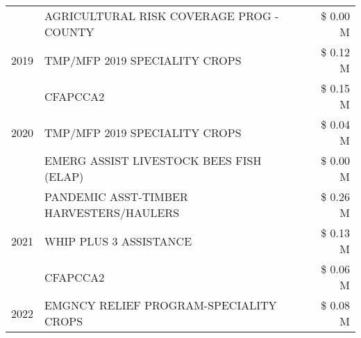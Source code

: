 \begin{tabular}{llr}
 & AGRICULTURAL RISK COVERAGE PROG - COUNTY & \$ 0.00 M \\
\cline{1-3}
2019 & TMP/MFP 2019 SPECIALITY CROPS & \$ 0.12 M \\
\cline{1-3}
\multirow[t]{3}{*}{2020} & CFAPCCA2 & \$ 0.15 M \\
 & TMP/MFP 2019 SPECIALITY CROPS & \$ 0.04 M \\
 & EMERG ASSIST LIVESTOCK BEES FISH (ELAP) & \$ 0.00 M \\
\cline{1-3}
\multirow[t]{3}{*}{2021} & PANDEMIC ASST-TIMBER HARVESTERS/HAULERS & \$ 0.26 M \\
 & WHIP PLUS 3 ASSISTANCE & \$ 0.13 M \\
 & CFAPCCA2 & \$ 0.06 M \\
\cline{1-3}
2022 & EMGNCY RELIEF PROGRAM-SPECIALITY CROPS & \$ 0.08 M \\
\cline{1-3}
\bottomrule
\end{tabular}

